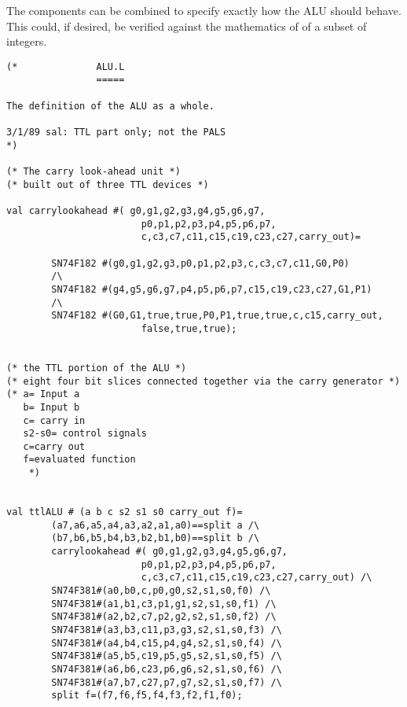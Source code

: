 The components can be combined to specify exactly how the ALU should behave.
This could, if desired, be verified against the mathematics of of a subset of integers.
\begin{verbatim}
(*              ALU.L
                =====

The definition of the ALU as a whole.

3/1/89 sal: TTL part only; not the PALS
*)

(* The carry look-ahead unit *)
(* built out of three TTL devices *)

val carrylookahead #( g0,g1,g2,g3,g4,g5,g6,g7,
                        p0,p1,p2,p3,p4,p5,p6,p7,
                        c,c3,c7,c11,c15,c19,c23,c27,carry_out)=

        SN74F182 #(g0,g1,g2,g3,p0,p1,p2,p3,c,c3,c7,c11,G0,P0)
        /\
        SN74F182 #(g4,g5,g6,g7,p4,p5,p6,p7,c15,c19,c23,c27,G1,P1)
        /\
        SN74F182 #(G0,G1,true,true,P0,P1,true,true,c,c15,carry_out,
                        false,true,true);


(* the TTL portion of the ALU *)
(* eight four bit slices connected together via the carry generator *)
(* a= Input a
   b= Input b
   c= carry in
   s2-s0= control signals
   c=carry out
   f=evaluated function
    *)


val ttlALU # (a b c s2 s1 s0 carry_out f)=
        (a7,a6,a5,a4,a3,a2,a1,a0)==split a /\
        (b7,b6,b5,b4,b3,b2,b1,b0)==split b /\
        carrylookahead #( g0,g1,g2,g3,g4,g5,g6,g7,
                        p0,p1,p2,p3,p4,p5,p6,p7,
                        c,c3,c7,c11,c15,c19,c23,c27,carry_out) /\
        SN74F381#(a0,b0,c,p0,g0,s2,s1,s0,f0) /\
        SN74F381#(a1,b1,c3,p1,g1,s2,s1,s0,f1) /\
        SN74F381#(a2,b2,c7,p2,g2,s2,s1,s0,f2) /\
        SN74F381#(a3,b3,c11,p3,g3,s2,s1,s0,f3) /\
        SN74F381#(a4,b4,c15,p4,g4,s2,s1,s0,f4) /\
        SN74F381#(a5,b5,c19,p5,g5,s2,s1,s0,f5) /\
        SN74F381#(a6,b6,c23,p6,g6,s2,s1,s0,f6) /\
        SN74F381#(a7,b7,c27,p7,g7,s2,s1,s0,f7) /\
        split f=(f7,f6,f5,f4,f3,f2,f1,f0);

\end{verbatim}
